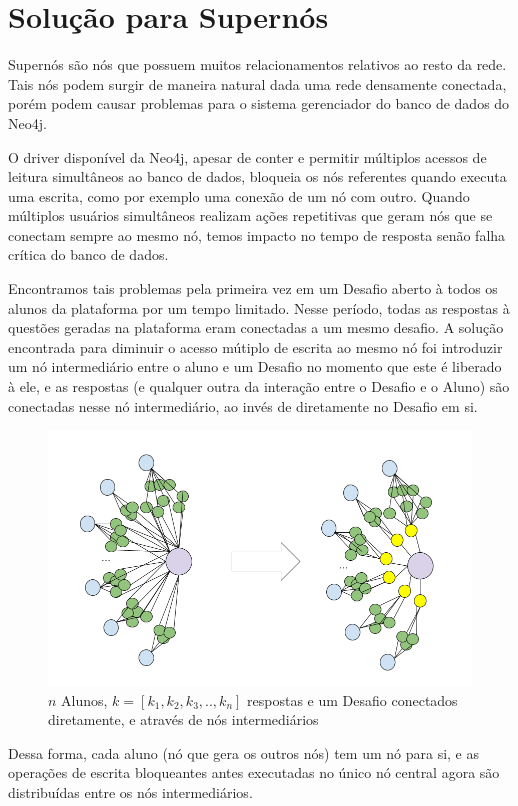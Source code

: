 \section{Solução para Supernós}

Supernós são nós que possuem muitos relacionamentos relativos ao resto da rede. Tais nós podem surgir de maneira natural dada uma rede densamente conectada, porém podem causar problemas para o sistema gerenciador do banco de dados do Neo4j.

O driver disponível da Neo4j, apesar de conter e permitir múltiplos acessos de leitura simultâneos ao banco de dados, bloqueia os nós referentes quando executa uma escrita, como por exemplo uma conexão de um nó com outro.
Quando múltiplos usuários simultâneos realizam ações repetitivas que geram nós que se conectam sempre ao mesmo nó, temos impacto no tempo de resposta senão falha crítica do banco de dados.

Encontramos tais problemas pela primeira vez em um Desafio aberto à todos os alunos da plataforma por um tempo limitado. Nesse período, todas as respostas à questões geradas na plataforma eram conectadas a um mesmo desafio. A solução encontrada para diminuir o acesso mútiplo de escrita ao mesmo nó foi introduzir um nó intermediário entre o aluno e um Desafio no momento que este é liberado à ele, e as respostas (e qualquer outra da interação entre o Desafio e o Aluno) são conectadas nesse nó intermediário, ao invés de diretamente no Desafio em si.

    \begin{figure}[H]
        \centering
        \includegraphics[width=1.0\linewidth]{Imagens/chap05/AssignedContext.png}
        \caption{\(n\) Alunos, \(k = [k_1, k_2, k_3, .., k_n]\) respostas e um Desafio conectados diretamente, e através de nós intermediários}
        \label{fig:profile-exemple}
    \end{figure}
Dessa forma, cada aluno (nó que gera os outros nós) tem um nó para si, e as operações de escrita bloqueantes antes executadas no único nó central agora são distribuídas entre os nós intermediários.

